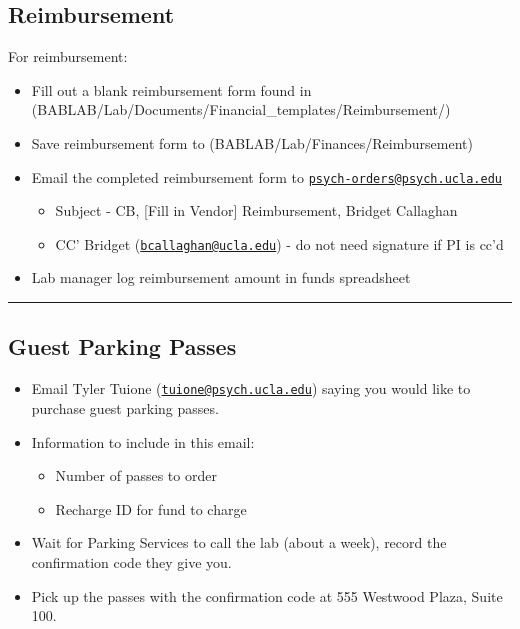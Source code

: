 \documentclass[]{book}
\providecommand{\tightlist}{%
  \setlength{\itemsep}{0pt}\setlength{\parskip}{0pt}}
\begin{document}
\subsection{Reimbursement}\label{reimbursement}

For reimbursement:

\begin{itemize}
\tightlist
\item
  Fill out a blank reimbursement form found in
  (BABLAB/Lab/Documents/Financial\_templates/Reimbursement/)
\item
  Save reimbursement form to (BABLAB/Lab/Finances/Reimbursement)
\item
  Email the completed reimbursement form to
  \href{mailto:psych-orders@psych.ucla.edu}{\nolinkurl{psych-orders@psych.ucla.edu}}

  \begin{itemize}
  \tightlist
  \item
    Subject - CB, {[}Fill in Vendor{]} Reimbursement, Bridget Callaghan
  \item
    CC' Bridget
    (\href{mailto:bcallaghan@ucla.edu}{\nolinkurl{bcallaghan@ucla.edu}})
    - do not need signature if PI is cc'd
  \end{itemize}
\item
  Lab manager log reimbursement amount in funds spreadsheet
\end{itemize}

\begin{center}\rule{0.5\linewidth}{0.5pt}\end{center}

\subsection{Guest Parking Passes}\label{guest-parking-passes}

\begin{itemize}
\tightlist
\item
  Email Tyler Tuione
  (\href{mailto:tuione@psych.ucla.edu}{\nolinkurl{tuione@psych.ucla.edu}})
  saying you would like to purchase guest parking passes.
\item
  Information to include in this email:

  \begin{itemize}
  \tightlist
  \item
    Number of passes to order
  \item
    Recharge ID for fund to charge
  \end{itemize}
\item
  Wait for Parking Services to call the lab (about a week), record the
  confirmation code they give you.
\item
  Pick up the passes with the confirmation code at 555 Westwood Plaza,
  Suite 100.
\end{itemize}
\end{document}
